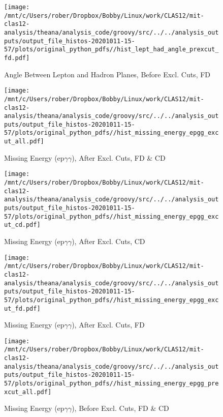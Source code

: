 \documentclass{article}
\begin{document}
\begin{landscape}
\begin{figure}[h]
        \texttt{[image: /mnt/c/Users/rober/Dropbox/Bobby/Linux/work/CLAS12/mit-clas12-analysis/theana/analysis\_code/groovy/src/../../analysis\_outputs/output\_file\_histos-20201011-15-57/plots/original\_python\_pdfs//hist\_lept\_had\_angle\_prexcut\_fd.pdf]}
        \captionsetup{textformat=empty,labelformat=blank}
        \caption{Angle Between Lepton and Hadron Planes, Before Excl. Cuts, FD}
    \end{figure}
    \clearpage
    
    \begin{figure}[h]
        \centering

        \texttt{[image: /mnt/c/Users/rober/Dropbox/Bobby/Linux/work/CLAS12/mit-clas12-analysis/theana/analysis\_code/groovy/src/../../analysis\_outputs/output\_file\_histos-20201011-15-57/plots/original\_python\_pdfs//hist\_missing\_energy\_epgg\_excut\_all.pdf]}
        \captionsetup{textformat=empty,labelformat=blank}
        \caption{Missing Energy (ep$\gamma$$\gamma$), After Excl. Cuts, FD \& CD}
    \end{figure}
    \clearpage
    
    \begin{figure}[h]
        \centering

        \texttt{[image: /mnt/c/Users/rober/Dropbox/Bobby/Linux/work/CLAS12/mit-clas12-analysis/theana/analysis\_code/groovy/src/../../analysis\_outputs/output\_file\_histos-20201011-15-57/plots/original\_python\_pdfs//hist\_missing\_energy\_epgg\_excut\_cd.pdf]}
        \captionsetup{textformat=empty,labelformat=blank}
        \caption{Missing Energy (ep$\gamma$$\gamma$), After Excl. Cuts, CD}
    \end{figure}
    \clearpage
    
    \begin{figure}[h]
        \centering

        \texttt{[image: /mnt/c/Users/rober/Dropbox/Bobby/Linux/work/CLAS12/mit-clas12-analysis/theana/analysis\_code/groovy/src/../../analysis\_outputs/output\_file\_histos-20201011-15-57/plots/original\_python\_pdfs//hist\_missing\_energy\_epgg\_excut\_fd.pdf]}
        \captionsetup{textformat=empty,labelformat=blank}
        \caption{Missing Energy (ep$\gamma$$\gamma$), After Excl. Cuts, FD}
    \end{figure}
    \clearpage
    
    \begin{figure}[h]
        \centering

        \texttt{[image: /mnt/c/Users/rober/Dropbox/Bobby/Linux/work/CLAS12/mit-clas12-analysis/theana/analysis\_code/groovy/src/../../analysis\_outputs/output\_file\_histos-20201011-15-57/plots/original\_python\_pdfs//hist\_missing\_energy\_epgg\_prexcut\_all.pdf]}
        \captionsetup{textformat=empty,labelformat=blank}
        \caption{Missing Energy (ep$\gamma$$\gamma$), Before Excl. Cuts, FD \& CD}
    \end{figure}
    \clearpage
    

\end{landscape}
\end{document}
